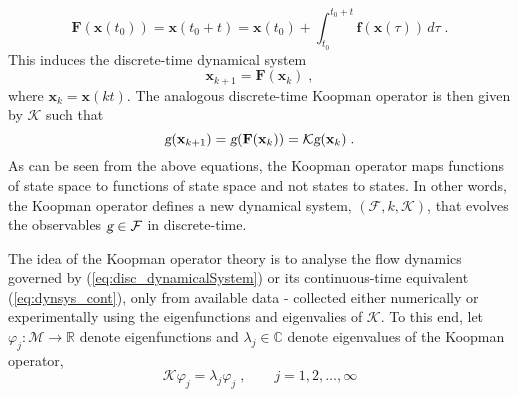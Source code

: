 % 
\begin{equation}
    \mathbf{F}(\mathbf{x}(t_0)) = \mathbf{x}(t_0+t) = \mathbf{x}(t_0) + \int_{t_0}^{{t_0} + t} {\textbf{f}(\mathbf{x}(\tau))}\,d\tau \;.
\end{equation}
% 
This induces the discrete-time dynamical system
% 
\begin{equation}
\label{eq:disc_dynamicalSystem}
    \mathbf{x}_{k+1} = \mathbf{F}(\mathbf{x}_k) \;,
\end{equation}
% 
where $\mathbf{x}_k = \mathbf{x}(kt)$. The analogous discrete-time Koopman operator is then given by $\mathcal{K}$ such that
% 
\begin{equation}
\label{eq:disc_KO}
    \textsl{g}(\mathbf{x}_{k+1})  = \textsl{g}(\mathbf{F}(\mathbf{x}_k)) = \mathcal{K}\textsl{g}(\mathbf{x}_k) \;.
\end{equation}
%
As can be seen from the above equations, the Koopman operator maps functions of state space to functions of state space and not states to states. In other words, the Koopman operator defines a new dynamical system, $(\mathcal{F},k,\mathcal{K})$, that evolves the observables $\textsl{g} \in \mathcal{F}$ in discrete-time. 
\par
The idea of the Koopman operator theory is to analyse the flow dynamics governed by (\ref{eq:disc_dynamicalSystem}) or its continuous-time equivalent (\ref{eq:dynsys_cont}), only from available data - collected either numerically or experimentally using the eigenfunctions and eigenvalies of $\mathcal{K}$. To this end, let $\varphi_j : \mathcal{M} \rightarrow \mathbb{R}$ denote eigenfunctions and $\lambda_j \in \mathbb{C}$ denote eigenvalues of the Koopman operator,
% 
\begin{equation}
\label{eq:spec_KO}
    \mathcal{K}\varphi_j = \lambda_j\varphi_j \;, \quad \quad j = 1,2,\dots,\infty
\end{equation}
% 

